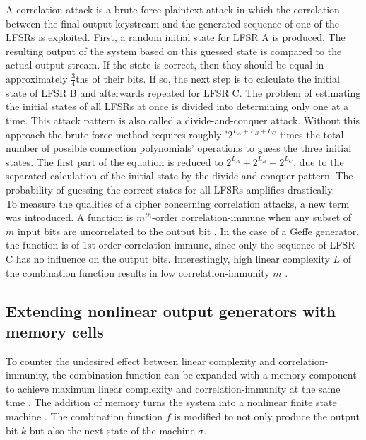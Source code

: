 A correlation attack is a brute-force plaintext attack in which the correlation between the final output keystream and the generated sequence of one of the LFSRs is exploited. First, a random initial state for LFSR A is produced. The resulting output of the system based on this guessed state is compared to the actual output stream. If the state is correct, then they should be equal in approximately $\frac{3}{4}$ths of their bits. If so, the next step is to calculate the initial state of LFSR B and afterwards repeated for LFSR C. The problem of estimating the initial states of all LFSRs at once is divided into determining only one at a time. This attack pattern is also called a divide-and-conquer attack. \cite[p. 17]{Robshaw.1995} Without this approach the brute-force method requires roughly '$2^{L_A + L_B + L_C}$ times the total number of possible connection polynomials' operations to guess the three initial states. The first part of the equation is reduced to $2^{L_A}+2^{L_B}+2^{L_C}$, due to the separated calculation of the initial state by the divide-and-conquer pattern. The probability of guessing the correct states for all LFSRs amplifies drastically. \cite[p. 235]{Smart.2016} \\

To measure the qualities of a cipher concerning correlation attacks, a new term was introduced. A function is $m^{th}$-order correlation-immune when any subset of $m$ input bits are uncorrelated to the output bit \cite[p. 777]{Siegenthaler.1984}. In the case of a Geffe generator, the function is of 1st-order correlation-immune, since only the sequence of LFSR C has no influence on the output bits. Interestingly, high linear complexity $L$ of the combination function results in low correlation-immunity $m$ \cite[p. 779]{Siegenthaler.1984}. 


\subsection{Extending nonlinear output generators with memory cells}

To counter the undesired effect between linear complexity and correlation-immunity, the combination function can be expanded with a memory component to achieve maximum linear complexity and correlation-immunity at the same time \cite[p. 17]{Robshaw.1995}. The addition of memory turns the system into a nonlinear finite state machine \cite[p. 209]{Wu.2008}. The combination function $f$ is modified to not only produce the output bit $k$ but also the next state of the machine $\sigma$. \\ 

